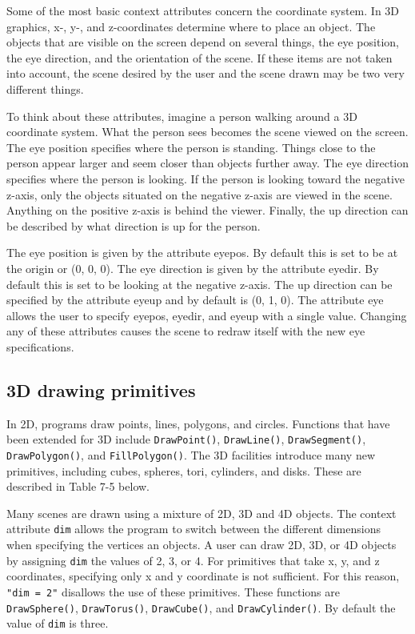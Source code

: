 Some of the most basic context attributes concern the coordinate
system.  In 3D graphics, x-, y-, and z-coordinates determine where to
place an object. The objects that are visible on the screen depend on
several things, the eye position, the eye direction, and the
orientation of the scene. If these items are not taken into account,
the scene desired by the user and the scene drawn may be two very
different things.

To think about these attributes, imagine a person walking around a 3D
coordinate system. What the person sees becomes the scene viewed on
the screen. The eye position specifies where the person is
standing. Things close to the person appear larger and seem closer
than objects further away. The eye direction specifies where the
person is looking. If the person is looking toward the negative
z-axis, only the objects situated on the negative z-axis are viewed in
the scene. Anything on the positive z-axis is behind the
viewer. Finally, the up direction can be described by what direction
is up for the person.

The eye position is given by the attribute eyepos. By default this is
set to be at the origin or (0, 0, 0). The eye direction is given by
the attribute eyedir. By default this is set to be looking at the
negative z-axis. The up direction can be specified by the attribute
eyeup and by default is (0, 1, 0). The attribute eye allows the user
to specify eyepos, eyedir, and eyeup with a single value. Changing any
of these attributes causes the scene to redraw itself with the new eye
specifications.

\subsection{3D drawing primitives}

In 2D, programs draw points, lines, polygons, and circles. Functions
that have been extended for 3D include \texttt{DrawPoint()},
\texttt{DrawLine()}, \texttt{DrawSegment()}, \texttt{DrawPolygon()},
and \texttt{FillPolygon()}. The 3D facilities introduce many new
primitives, including cubes, spheres, tori, cylinders, and
disks. These are described in Table 7-5 below.

Many scenes are drawn using a mixture of 2D, 3D and 4D objects. The
context attribute \texttt{dim} allows the program to switch between
the different dimensions when specifying the vertices an objects. A
user can draw 2D, 3D, or 4D objects by assigning \texttt{dim} the
values of 2, 3, or 4. For primitives that take x, y, and z
coordinates, specifying only x and y coordinate is not sufficient. For
this reason, \texttt{"dim = 2"} disallows the use of these
primitives. These functions are \texttt{DrawSphere()},
\texttt{DrawTorus()}, \texttt{DrawCube()}, and
\texttt{DrawCylinder()}. By default the value of \texttt{dim} is
three.

